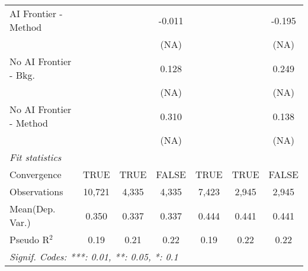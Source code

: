 \begin{tabular}{lcccccc}
   AI Frontier - Method    &               &         & -0.011 &               &             & -0.195\\   
                           &               &         & (NA)   &               &             & (NA)\\   
   No AI Frontier - Bkg.   &               &         & 0.128  &               &             & 0.249\\   
                           &               &         & (NA)   &               &             & (NA)\\   
   No AI Frontier - Method &               &         & 0.310  &               &             & 0.138\\   
                           &               &         & (NA)   &               &             & (NA)\\   
   \midrule
   \emph{Fit statistics}\\
   Convergence             &TRUE           & TRUE    & FALSE  & TRUE          & TRUE        & FALSE\\  
   Observations            & 10,721        & 4,335   & 4,335  & 7,423         & 2,945       & 2,945\\  
Mean(Dep. Var.) & 0.350 & 0.337 & 0.337 & 0.444 & 0.441 & 0.441 \\
   Pseudo R$^2$            & 0.19          & 0.21    & 0.22   & 0.19          & 0.22        & 0.22\\  
   \midrule \midrule
   \multicolumn{7}{l}{\emph{Signif. Codes: ***: 0.01, **: 0.05, *: 0.1}}\\
\end{tabular}
\par\endgroup
